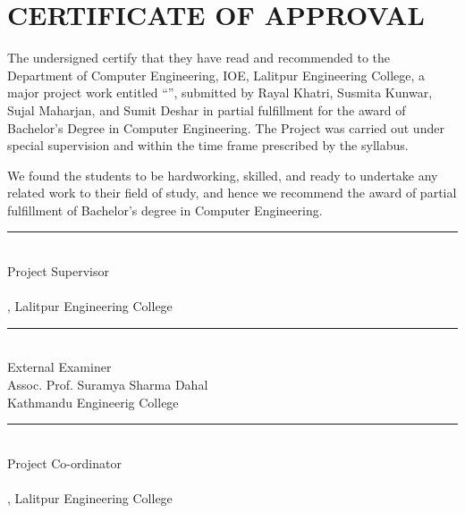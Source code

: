 \section*{CERTIFICATE OF APPROVAL}
\begingroup

The undersigned certify that they have read and recommended to the Department of Computer Engineering, IOE, Lalitpur Engineering College, a major project work entitled ``\textbf{\thetitle}'', submitted by Rayal Khatri, Susmita Kunwar, Sujal Maharjan, and Sumit Deshar in partial fulfillment for the award of Bachelor’s Degree in Computer Engineering. The Project was carried out under special supervision and within the time frame prescribed by the syllabus.

We found the students to be hardworking, skilled, and ready to undertake any related work to their field of study, and hence we recommend the award of partial fulfillment of Bachelor’s degree in Computer Engineering.

\vspace{.7cm}


\rule{0.62\textwidth}{0.4pt}\\
Project Supervisor\\
\thesupervisor\\
\thedepartment, Lalitpur Engineering College



\vspace{.7cm}

\rule{0.62\textwidth}{0.4pt}\\
External Examiner\\
Assoc. Prof. Suramya Sharma Dahal \\
Kathmandu Engineerig College

\vspace{.7cm}


\rule{0.62\textwidth}{0.4pt}\\
Project Co-ordinator\\
\theprogramcoordinator\\
\thedepartment, Lalitpur Engineering College





\vspace{0.5cm}

\noindent \thedate
\endgroup